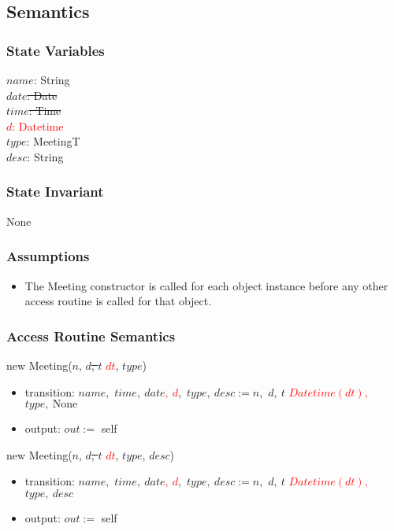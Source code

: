 \documentclass[12pt, titlepage]{article}
\begin{document}
\subsection* {Semantics}
\subsubsection* {State Variables}
$name$: String\\
{\sout{$date$: Date}}\\
{\sout{$time$: Time}}\\
\textcolor{red}{$d$: Datetime}\\
$type$: MeetingT\\
$desc$: String

\subsubsection* {State Invariant}
None

\subsubsection* {Assumptions}
\begin{itemize}
  \item The Meeting constructor is called for each object instance before any other access routine is called for that object.
\end{itemize}


\subsubsection* {Access Routine Semantics}
\noindent new Meeting($n$, \sout{$d$, $t$} \textcolor{red}{$dt$}, $type$)
\begin{itemize}
    \item transition: $name,$ \sout{$time,\ date$}\textcolor{red}{$,\ d$},\ $type,\ desc := n,$ \sout{$d,\ t$} \textcolor{red}{$Datetime(dt),$}\ $type,\ \text{None}$
    \item output: $out :=$ self
\end{itemize}

\noindent new Meeting($n$, \sout{$d$, $t$} \textcolor{red}{$dt$}, $type$, $desc$)
\begin{itemize}
    \item transition: $name,$ \sout{$time,\ date$}\textcolor{red}{$,\ d$},\ $type,\ desc := n,$ \sout{$d,\ t$} \textcolor{red}{$Datetime(dt),$}\ $type,\ desc$
    \item output: $out :=$ self
\end{itemize}
\end{document}
